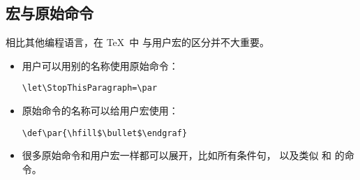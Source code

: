 \documentclass[letterpaper]{book}
\begin{document}
\subsection{宏与原始命令}

%     
相比其他编程语言，在 \TeX\ 中%
与用户宏的区分并不大重要。 
\begin{itemize}
\item 用户可以用别的名称使用原始命令： 
\begin{verbatim}
\let\StopThisParagraph=\par
\end{verbatim}
\item 原始命令的名称可以给用户宏使用：
\begin{verbatim}
\def\par{\hfill$\bullet$\endgraf}
\end{verbatim}
\item 很多原始命令和用户宏一样都可以展开，比如所有条件句，
以及类似  和  的命令。
\end{itemize}

\end{document}
